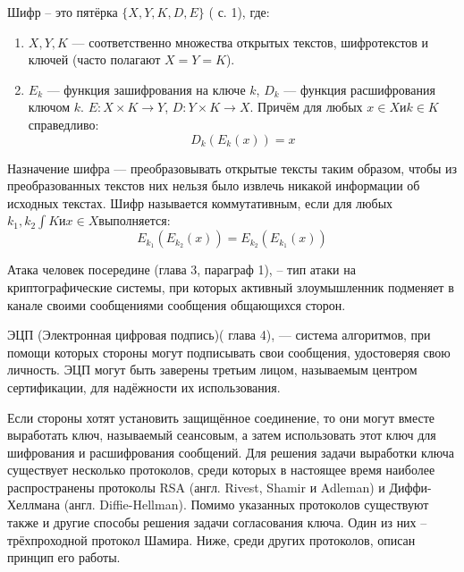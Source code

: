 Шифр – это пятёрка $\{X, Y, K, D, E\}$ \autocite{Drs}( с. 1), где:
\begin{enumerate}
	\item $X, Y, K$ --- соответственно множества открытых текстов, шифротекстов и ключей (часто полагают $X = Y = K$).\\
	\item $E_{k}$ --- функция зашифрования на ключе $k$, $D_{k}$ --- функция расшифрования ключом $k$. $E : X \times K \rightarrow Y$, $D : Y \times K \rightarrow X$. Причём для любых $x \in X и k \in K$справедливо:
	$$D_{k}(E_{k}(x)) = x$$
\end{enumerate}

Назначение шифра --- преобразовывать открытые тексты таким образом, чтобы из преобразованных текстов них нельзя было извлечь никакой информации об исходных текстах. 
Шифр называется коммутативным, если для любых $k_{1},k_{2}\int K и x  \in X$выполняется:
		$$E_{k_{1}}(E_{k_{2}}(x)) = E_{k_{2}}(E_{k_{1}}(x))$$
		
Атака человек посередине \autocite{Shnayer}(глава 3, параграф 1), – тип атаки на криптографические системы, при которых активный злоумышленник подменяет в канале своими сообщениями сообщения общающихся сторон.

ЭЦП (Электронная цифровая подпись)\autocite{Shnayer}( глава 4), --- система алгоритмов, при помощи которых стороны могут подписывать свои сообщения, удостоверяя свою личность. ЭЦП могут быть заверены третьим лицом, называемым центром сертификации, для надёжности их использования.

Если стороны хотят установить защищённое соединение, то они могут вместе выработать ключ, называемый сеансовым, а затем использовать этот ключ для шифрования и расшифрования сообщений. Для решения задачи выработки ключа существует несколько протоколов, среди которых в настоящее время наиболее распространены протоколы RSA (англ. Rivest, Shamir и Adleman) и Диффи-Хеллмана (англ. Diffie-Hellman). 
Помимо указанных протоколов существуют также и другие способы решения задачи согласования ключа. Один из них – трёхпроходной протокол Шамира. Ниже, среди других протоколов, описан принцип его работы.
